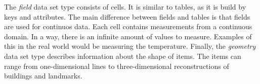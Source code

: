 \documentclass[Report.tex]{subfiles}
\begin{document}
The \emph{field} data set type consists of cells. It is similar to tables, as it is build by keys and attributes. The main difference between fields and tables is that fields are used for continuos data. Each cell contains measurements from a continuous domain. In a way, there is an infinite amount of values to measure. Examples of this in the real world would be measuring the temperature. 
Finally, the \emph{geometry} data set type describes information about the shape of items. The items can range from one-dimensional lines to three-dimensional reconstructions of buildings and landmarks.  
\end{document}
